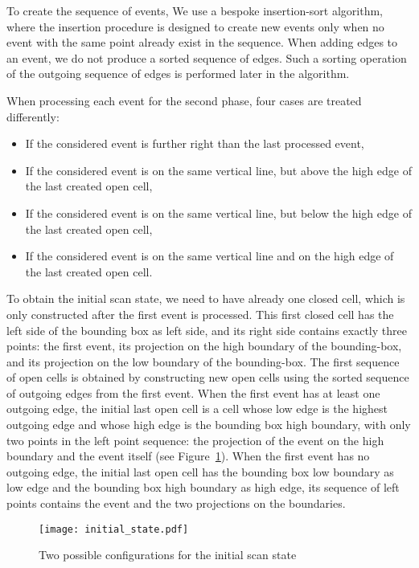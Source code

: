 \documentclass[a4paper, USenglish, cleveref, autoref, thm-restate]{lipics-v2021}
\begin{document}
To create the sequence of events,
We use a bespoke insertion-sort algorithm, where the insertion
procedure is designed to create new events only when no event with the
same point already exist in the sequence.  When adding edges to an
event, we do not produce a sorted sequence of edges.  Such a sorting
operation of the outgoing sequence of edges is performed later in the
algorithm.

When processing each event for the second phase,
four cases are treated differently:
\begin{itemize}
\item If the considered event is further right than the last processed event,
\item If the considered event is on the same vertical line, but above the
high edge of the last created open cell,
\item If the considered event is on the same vertical line, but below the
high edge of the last created open cell,
\item If the considered event is on the same vertical line and on the
  high edge of the last created open cell.
\end{itemize}

To obtain the initial scan state, we need to have already one closed
cell, which is only constructed after the first event is processed.
This first closed cell has the left side of the bounding box as left
side, and its right side contains exactly three points: the first
event, its projection on the high boundary of the bounding-box, and its
projection on the low boundary of the bounding-box.  The first
sequence of open cells is obtained by constructing new open cells
using the sorted sequence of outgoing edges from the first event.
When the first event has at least
one outgoing edge, the initial last open cell is a cell whose low edge
is the highest outgoing edge and whose high edge is the bounding box
high boundary, with only two points in the left point sequence: the
projection of the event on the high boundary and the event itself (see Figure~\ref{figure:initial}).
When the first event has no outgoing edge, the initial last open cell
has the bounding box low boundary as low edge and the bounding box
high boundary as high edge, its sequence of left points contains the
event and the two projections on the boundaries.
\begin{figure}
\texttt{[image: initial\_state.pdf]}
\caption{\label{figure:initial}Two possible configurations for the initial scan state}
\end{figure}
\end{document}
